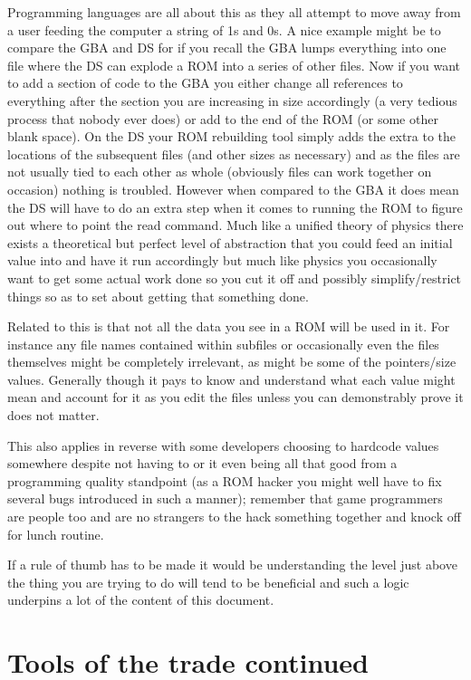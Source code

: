 \documentclass[
]{book}
\begin{document}
Programming languages are all about this as they all attempt to move away from a user feeding the computer a string of 1s and 0s. A nice example might be to compare the GBA and DS for if you recall the GBA lumps everything into one file where the DS can explode a ROM into a series of other files. Now if you want to add a section of code to the GBA you either change all references to everything after the section you are increasing in size accordingly (a very tedious process that nobody ever does) or add to the end of the ROM (or some other blank space). On the DS your ROM rebuilding tool simply adds the extra to the locations of the subsequent files (and other sizes as necessary) and as the files are not usually tied to each other as whole (obviously files can work together on occasion) nothing is troubled. However when compared to the GBA it does mean the DS will have to do an extra step when it comes to running the ROM to figure out where to point the read command. Much like a unified theory of physics there exists a theoretical but perfect level of abstraction that you could feed an initial value into and have it run accordingly but much like physics you occasionally want to get some actual work done so you cut it off and possibly simplify/restrict things so as to set about getting that something done.

Related to this is that not all the data you see in a ROM will be used in it. For instance any file names contained within subfiles or occasionally even the files themselves might be completely irrelevant, as might be some of the pointers/size values. Generally though it pays to know and understand what each value might mean and account for it as you edit the files unless you can demonstrably prove it does not matter.

This also applies in reverse with some developers choosing to hardcode values somewhere despite not having to or it even being all that good from a programming quality standpoint (as a ROM hacker you might well have to fix several bugs introduced in such a manner); remember that game programmers are people too and are no strangers to the hack something together and knock off for lunch routine.

If a rule of thumb has to be made it would be understanding the level just above the thing you are trying to do will tend to be beneficial and such a logic underpins a lot of the content of this document.

\hypertarget{tools-of-the-trade-continued}{%
\section{Tools of the trade continued}\label{tools-of-the-trade-continued}}
\end{document}
